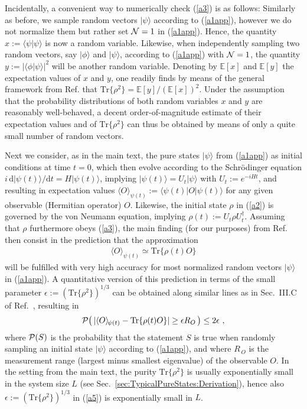 \documentclass[twocolumn,aps,prb,floatfix,superscriptaddress]{revtex4-2}
\newcommand{\<}{\left\langle}	%
\renewcommand{\>}{\right\rangle}	%
\newcommand{\pu}{\tr\{\rho^2\}}
\newcommand{\prob}{{\cal P}}
\newcommand{\tr}{\mbox{Tr}}
\newcommand{\DO}{R_{\!\, O}}
\begin{document}
Incidentally, a convenient way to numerically check
(\ref{a3}) is as follows:
Similarly as before, we sample random vectors $|\psi\rangle$
according to (\ref{a1app}), however we do not normalize them 
but rather set ${\cal{N}}=1$ in (\ref{a1app}).
Hence, the quantity $x:=\langle \psi|\psi\rangle$ 
is now a random variable. 
Likewise, when independently sampling
two random vectors, say $|\phi\rangle$ and $|\psi\rangle$,
according to (\ref{a1app}) with ${\cal{N}}=1$,
the quantity  $y:=|\langle \phi | \psi\rangle|^2$ 
will be another random variable.
Denoting by ${\mathbb E}[x]$ and ${\mathbb E}[y]$ the 
expectation values 
of $x$ and $y$,
one readily finds by means of the general framework 
from Ref. \cite{rei20} 
that $\pu={\mathbb E}[y]/({\mathbb E}[x])^2$.
Under the assumption that the probability distributions
of both random variables $x$ and $y$ are reasonably
well-behaved, a decent order-of-magnitude estimate
of their expectation values 
and of $\pu$ can thus be obtained by means of
only a quite small number of random vectors.

Next we consider, as in the main text, 
the pure states  $|\psi\rangle$
from (\ref{a1app}) as initial conditions
at time $t=0$,
which then evolve according to the 
Schr\"odinger equation 
$i\,\mbox{d} |\psi(t)\rangle/ \mbox{d} t=H|\psi(t)\rangle$, 
implying $|\psi(t)\rangle=U_t |\psi\rangle$
with $U_t:=e^{-iHt}$,
and resulting in expectation values 
$\langle O\rangle_{\! \psi(t)}:=\langle \psi (t)|O| \psi (t)\rangle$
for any given observable (Hermitian operator) $O$.
Likewise, the initial state $\rho$
in (\ref{a2}) is governed by the von
Neumann equation, implying
$\rho(t):=U_t\rho U_t^\dagger$.
Assuming that $\rho$ furthermore
obeys (\ref{a3}), 
the main finding (for our purposes) from
Ref.~\cite{rei20} then consist in the prediction that
the approximation
\begin{eqnarray}
\langle O\rangle_{\! \psi(t)}
\simeq
\tr\{\rho(t) O\}
\label{a4}
\end{eqnarray}
will be fulfilled with very high accuracy
for most normalized random vectors 
$|\psi \rangle$ in (\ref{a1app}). 
A quantitative version of this prediction in terms 
of the small parameter $\epsilon:=(\pu)^{1/3}$ 
can be obtained along similar lines as in 
Sec.~III.C of Ref.~\cite{rei18}, resulting in
\begin{eqnarray}
\prob\! \left(\, 
|\langle O\rangle_{\! \psi(t)} - \tr\{\rho(t) O\}|\geq \epsilon \DO
\,\right)
\leq 2 \epsilon
\ ,
\label{a5}
\end{eqnarray}
where $\prob(S)$ is the probability that the statement 
$S$ is true when randomly sampling an initial state
$|\psi\rangle$ according to (\ref{a1app}), and where
$\DO$ is the measurement range
(largest minus smallest eigenvalue) of the 
observable $O$.
In the setting from the main text,
the purity $\pu$ 
is usually exponentially small in the system size $L$ (see Sec.~\ref{sec:TypicalPureStates:Derivation}), 
hence also $\epsilon:=(\pu)^{1/3}$ in (\ref{a5})
is exponentially small in $L$.
\end{document}
